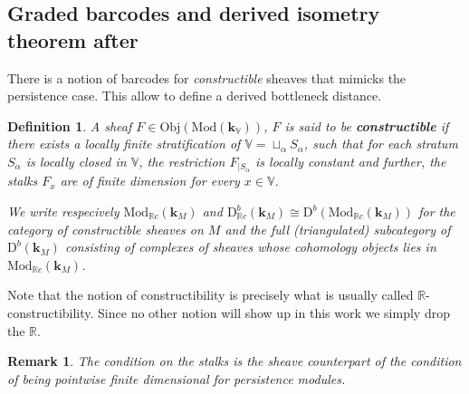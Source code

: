 \documentclass[a4paper, english, 11pt]{article}
\newcommand{\kk}[0]{\textbf{k}}
\newcommand{\Mod}[0]{\text{Mod}}
\newcommand{\0}{\vec{0}}
\newcommand{\R}[0]{\mathbb{R}}
\newcommand{\V}[0]{\mathbb{V}}
\newcommand{\D}[0]{\text{D}}
\newcommand{\Obj}[0]{\text{Obj}}
\newtheorem{remark}[prop]{Remark}
\newtheorem{defi}[prop]{Definition}
\begin{document}
\subsection{Graded barcodes and derived isometry theorem after~\cite{Berk18}}
There is a notion of barcodes for \emph{constructible} sheaves that mimicks the persistence case. This allow  to define a derived bottleneck distance.


\begin{defi}
A sheaf  $F\in \Obj(\Mod(\kk_\V))$, $F$ is said to be \textbf{constructible} if there exists a locally finite stratification of $\V = \sqcup_\alpha S_\alpha$, such that for each stratum $S_\alpha$ is locally closed in $\V$, the restriction $F_{|S_\alpha}$ is locally constant and further,  the stalks $F_x$ are of finite dimension for every $x\in \V$. 

We  write respecively $\Mod_{\R c}(\kk_M)$ and $\D^b_{\R c}(\kk_M)\cong \D^b(\Mod_{\R c}(\kk_M))$ for the  category of constructible sheaves on $M$ and  the full (triangulated) subcategory of $\D^b(\kk_M)$ consisting of complexes of sheaves whose cohomology objects lies in $\Mod_{\R c}(\kk_M)$.
\end{defi}
Note that the notion of constructibility is precisely what is usually called $\R$-constructibility. Since no other notion will show up in this work we simply drop the $\R$. 
\begin{remark} The condition on the stalks is the sheave counterpart of the condition of being pointwise finite dimensional  for persistence modules.   
\end{remark}
\end{document}
